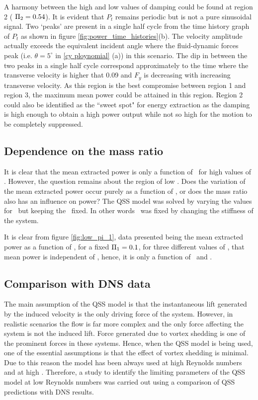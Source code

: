 A harmony between the high and low values of damping could be found at region 2  ( $\Pi_2=0.54$). It is evident that $P_t$ remains periodic but is not a pure sinusoidal signal. Two `peaks' are present in a single half cycle from the time history graph of $P_t$ as shown in figure \ref{fig:power_time_histories}(b). The velocity amplitude actually exceeds the equivalent incident angle where the fluid-dynamic forces peak (i.e. $\theta=5^\circ$ in \ref{cy ploynomial} (a)) in this scenario. The dip in between the two peaks in a single half cycle correspond approximately to the time where the transverse velocity is higher that 0.09 and $F_y$ is decreasing with increasing transverse velocity. As this region is the best compromise between region 1 and region 3, the maximum mean power could be attained in this region. Region 2 could also be identified as the ``sweet spot" for energy extraction as the damping is high enough to obtain a high power output while not so high for the motion to be completely suppressed. 


\subsection{Dependence on the mass ratio \mstar}
\label{sec:chp-pi_1_pi2_mstar}


It is clear that the mean extracted power is only a function of \massdamp \ for high values of \massstiff. However, the question remains about the region of low \massstiff. Does the variation of the mean extracted power occur purely as a function of \massstiff, or does the mass ratio also has an influence on power? The QSS model was solved by varying the values for \mstar\
but keeping the \massstiff\ fixed. In other words \massstiff\ was fixed by changing the stiffness of the system. 
 
It is clear from figure \ref{fig:low_pi_1}, data presented being the mean extracted power  as a function of \massdamp, for a fixed $\Pi_1 = 0.1$, for three different values of \mstar, that mean power is independent of \mstar, hence, it is only a function of \massstiff\ and \massdamp.




\subsection{Comparison with DNS data}
\label{sec:chp-pi_1_pi2_dns}

The main assumption of the QSS model is that the instantaneous lift generated by the induced velocity is the only driving force of the system. However, in realistic scenarios the flow is far more complex and the only force affecting the system is not the induced lift. Force generated due to vortex shedding is one of the prominent forces in these systems. Hence, when the QSS model is being used, one of the essential assumptions is that the effect of vortex shedding is minimal. Due to this reason the model has been always used at high Reynolds numbers and at high \mstar. Therefore, a study to identify the limiting parameters of the QSS model at low Reynolds numbers was carried out  using a comparison of QSS predictions with DNS results.


